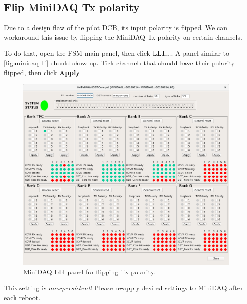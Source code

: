 \subsection{Flip MiniDAQ Tx polarity}
Due to a design flaw of the pilot DCB, its input polarity is flipped.
We can workaround this issue by flipping the MiniDAQ Tx polarity on certain
channels.

To do that, open the FSM main panel, then click \textbf{LLI...}.
A panel similar to \autoref{fig:minidaq-lli} should show up.
Tick channels that should have their polarity flipped, then click \textbf{Apply}

\begin{figure}[ht]
    \centering
    \includegraphics[width=\textwidth]{res/flip_tx_polarity_in_minidaq.png}
    \caption{MiniDAQ LLI panel for flipping Tx polarity.}
    \label{fig:minidaq-lli}
\end{figure}

\begin{leftbar}
    This setting is \emph{non-persistent}!
    Please re-apply desired settings to MiniDAQ after each reboot.
\end{leftbar}

